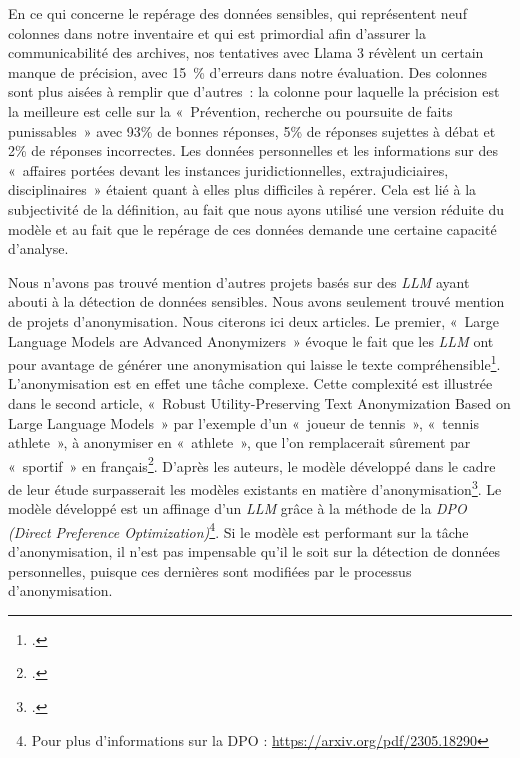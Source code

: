 	En ce qui concerne le repérage des données sensibles, qui représentent
	neuf colonnes dans notre inventaire et qui est primordial afin d'assurer
	la communicabilité des archives, nos tentatives avec Llama 3 révèlent un
	certain manque de précision, avec 15~\% d'erreurs dans notre évaluation.
	Des colonnes sont plus aisées à remplir que d'autres~: la colonne
	pour laquelle la précision est la meilleure est celle sur la
	«~Prévention, recherche ou poursuite de faits punissables~» avec 93\% de
	bonnes réponses, 5\% de réponses sujettes à débat et 2\% de réponses
	incorrectes. Les données personnelles et les informations sur des
	«~affaires portées devant les instances juridictionnelles,
	extrajudiciaires, disciplinaires~» étaient quant à elles plus difficiles
	à repérer. Cela est lié à la subjectivité de la définition, au fait que
	nous ayons utilisé une version réduite du modèle et au fait que le
	repérage de ces données demande une certaine capacité d'analyse. 
	
	Nous
	n'avons pas trouvé mention d'autres projets basés sur des \emph{LLM} ayant
	abouti à la détection de données sensibles. Nous avons seulement
	trouvé mention de projets d'anonymisation. Nous citerons ici deux
	articles. Le premier, «~Large Language Models are Advanced Anonymizers~»
	évoque le fait que les \emph{LLM} ont pour avantage de générer une
	anonymisation qui laisse le texte compréhensible\footcite{anony}. L'anonymisation est en effet une tâche complexe. Cette
	complexité est illustrée dans le second article, «~Robust
	Utility-Preserving Text Anonymization Based on Large Language Models~»
	par l'exemple d'un «~joueur de tennis~», «~tennis athlete~», à anonymiser
	en «~athlete~», que l'on remplacerait sûrement par «~sportif~» en
	français\footcite{yang_robust_2024}. D'après les auteurs, le modèle développé dans le
	cadre de leur étude surpasserait les modèles existants en matière
	d'anonymisation\footcite{yang_robust_2024}. Le modèle développé est un
	affinage d'un \emph{LLM} grâce à la méthode de la \emph{DPO (Direct Preference
		Optimization)}\footnote{Pour plus d'informations sur la DPO :
		\url{https://arxiv.org/pdf/2305.18290}}. Si le modèle est performant sur la
	tâche d'anonymisation, il n'est pas impensable qu'il le soit sur la
	détection de données personnelles, puisque ces dernières sont modifiées
	par le processus d'anonymisation.
	
